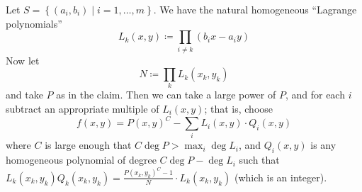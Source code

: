 Let $S = \left\{ (a_i, b_i) \mid i=1, \dots, m \right\}$.
We have the natural homogeneous ``Lagrange polynomials''
\[ L_k(x,y) \coloneqq \prod_{i \neq k} (b_i x - a_i y) \]
Now let
\[ N \coloneqq \prod_k L_k(x_k, y_k) \]
and take $P$ as in the claim.
Then we can take a large power of $P$,
and for each $i$ subtract an appropriate multiple of $L_i(x,y)$; that is, choose
\[
  f(x,y)
  = P(x,y)^{C} - \sum_i L_i(x,y) \cdot Q_i(x,y)
\]
where $C$ is large enough that $C \deg P > \max_i \deg L_i$,
and $Q_i(x,y)$ is any homogeneous polynomial of degree $C \deg P - \deg L_i$
such that $L_k(x_k, y_k) Q_k(x_k, y_k) = \frac{P(x_k, y_k)^C - 1}{N} \cdot L_k(x_k, y_k)$
(which is an integer).
\pagebreak



